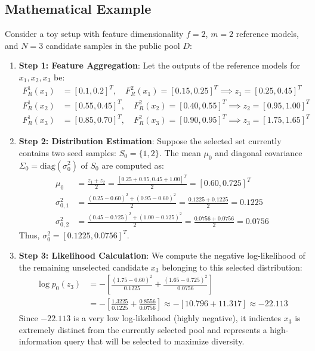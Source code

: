 \documentclass{article}
\begin{document}
\subsection{Mathematical Example}
Consider a toy setup with feature dimensionality $f=2$, $m=2$ reference models, and $N=3$ candidate samples in the public pool $D$:
\begin{enumerate}
    \item \textbf{Step 1: Feature Aggregation}: Let the outputs of the reference models for $x_1, x_2, x_3$ be:
    \begin{align*}
        F_R^1(x_1) &= [0.1, 0.2]^T, \quad F_R^2(x_1) = [0.15, 0.25]^T \implies z_1 = [0.25, 0.45]^T \\
        F_R^1(x_2) &= [0.55, 0.45]^T, \quad F_R^2(x_2) = [0.40, 0.55]^T \implies z_2 = [0.95, 1.00]^T \\
        F_R^1(x_3) &= [0.85, 0.70]^T, \quad F_R^2(x_3) = [0.90, 0.95]^T \implies z_3 = [1.75, 1.65]^T
    \end{align*}
    \item \textbf{Step 2: Distribution Estimation}: Suppose the selected set currently contains two seed samples: $S_0 = \{1, 2\}$. The mean $\mu_0$ and diagonal covariance $\Sigma_0 = \text{diag}(\sigma^2_0)$ of $S_0$ are computed as:
    \begin{align*}
        \mu_{0} &= \frac{z_1 + z_2}{2} = \frac{[0.25+0.95, 0.45+1.00]^T}{2} = [0.60, 0.725]^T \\
        \sigma^2_{0,1} &= \frac{(0.25 - 0.60)^2 + (0.95 - 0.60)^2}{2} = \frac{0.1225 + 0.1225}{2} = 0.1225 \\
        \sigma^2_{0,2} &= \frac{(0.45 - 0.725)^2 + (1.00 - 0.725)^2}{2} = \frac{0.0756 + 0.0756}{2} = 0.0756
    \end{align*}
    Thus, $\sigma^2_0 = [0.1225, 0.0756]^T$.
    \item \textbf{Step 3: Likelihood Calculation}: We compute the negative log-likelihood of the remaining unselected candidate $x_3$ belonging to this selected distribution:
    \begin{align*}
        \log p_0(z_3) &= - \left[ \frac{(1.75 - 0.60)^2}{0.1225} + \frac{(1.65 - 0.725)^2}{0.0756} \right] \\
        &= - \left[ \frac{1.3225}{0.1225} + \frac{0.8556}{0.0756} \right] \approx - [10.796 + 11.317] \approx -22.113
    \end{align*}
    Since $-22.113$ is a very low log-likelihood (highly negative), it indicates $x_3$ is extremely distinct from the currently selected pool and represents a high-information query that will be selected to maximize diversity.
\end{enumerate}
\end{document}
